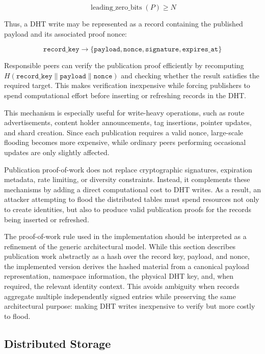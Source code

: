 \documentclass[12pt,a4paper]{article}
\begin{document}
\[
\operatorname{leading\_zero\_bits}(P) \geq N
\]

Thus, a DHT write may be represented as a record containing the published payload
and its associated proof nonce:

\[
\texttt{record\_key} \rightarrow
\{
\texttt{payload},
\texttt{nonce},
\texttt{signature},
\texttt{expires\_at}
\}
\]

Responsible peers can verify the publication proof efficiently by recomputing
\(H(\texttt{record\_key} \parallel \texttt{payload} \parallel \texttt{nonce})\) and checking whether the result satisfies the
required target. This makes verification inexpensive while forcing publishers to
spend computational effort before inserting or refreshing records in the DHT.

This mechanism is especially useful for write-heavy operations, such as route
advertisements, content holder announcements, tag insertions, pointer updates, and
shard creation. Since each publication requires a valid nonce, large-scale flooding
becomes more expensive, while ordinary peers performing occasional updates are only
slightly affected.

Publication proof-of-work does not replace cryptographic signatures, expiration
metadata, rate limiting, or diversity constraints. Instead, it complements these
mechanisms by adding a direct computational cost to DHT writes. As a result, an
attacker attempting to flood the distributed tables must spend resources not only to
create identities, but also to produce valid publication proofs for the records being
inserted or refreshed.

The proof-of-work rule used in the implementation should be interpreted as a refinement of the generic architectural model. While this section describes publication work abstractly as a hash over the record key, payload, and nonce, the implemented version derives the hashed material from a canonical payload representation, namespace information, the physical DHT key, and, when required, the relevant identity context. This avoids ambiguity when records aggregate multiple independently signed entries while preserving the same architectural purpose: making DHT writes inexpensive to verify but more costly to flood.






\subsection{Distributed Storage}
\end{document}
